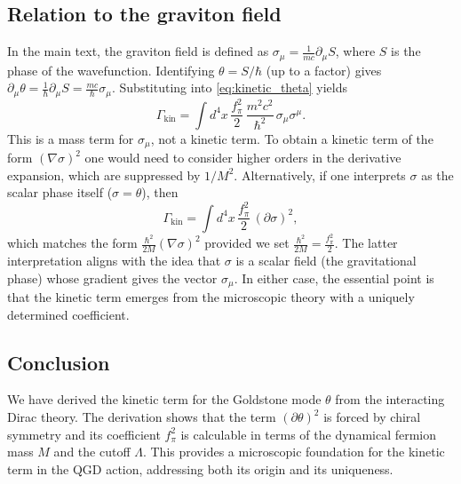 \documentclass[11pt]{article}
\begin{document}
\subsection*{Relation to the graviton field}
In the main text, the graviton field is defined as \(\sigma_\mu = \frac{1}{mc}\partial_\mu S\), where \(S\) is the phase of the wavefunction. Identifying \(\theta = S/\hbar\) (up to a factor) gives \(\partial_\mu\theta = \frac{1}{\hbar}\partial_\mu S = \frac{mc}{\hbar}\sigma_\mu\). Substituting into \eqref{eq:kinetic_theta} yields
\begin{equation}
\Gamma_{\text{kin}} = \int d^4x\,\frac{f_\pi^2}{2}\,\frac{m^2c^2}{\hbar^2}\,\sigma_\mu\sigma^\mu.
\end{equation}
This is a mass term for \(\sigma_\mu\), not a kinetic term. To obtain a kinetic term of the form \((\nabla\sigma)^2\) one would need to consider higher orders in the derivative expansion, which are suppressed by \(1/M^2\). Alternatively, if one interprets \(\sigma\) as the scalar phase itself (\(\sigma = \theta\)), then
\begin{equation}
\Gamma_{\text{kin}} = \int d^4x\,\frac{f_\pi^2}{2}\,(\partial\sigma)^2,
\end{equation}
which matches the form \(\frac{\hbar^2}{2M}(\nabla\sigma)^2\) provided we set \(\frac{\hbar^2}{2M} = \frac{f_\pi^2}{2}\). The latter interpretation aligns with the idea that \(\sigma\) is a scalar field (the gravitational phase) whose gradient gives the vector \(\sigma_\mu\). In either case, the essential point is that the kinetic term emerges from the microscopic theory with a uniquely determined coefficient.

\subsection*{Conclusion}
We have derived the kinetic term for the Goldstone mode \(\theta\) from the interacting Dirac theory. The derivation shows that the term \((\partial\theta)^2\) is forced by chiral symmetry and its coefficient \(f_\pi^2\) is calculable in terms of the dynamical fermion mass \(M\) and the cutoff \(\Lambda\). This provides a microscopic foundation for the kinetic term in the QGD action, addressing both its origin and its uniqueness.
\end{document}
